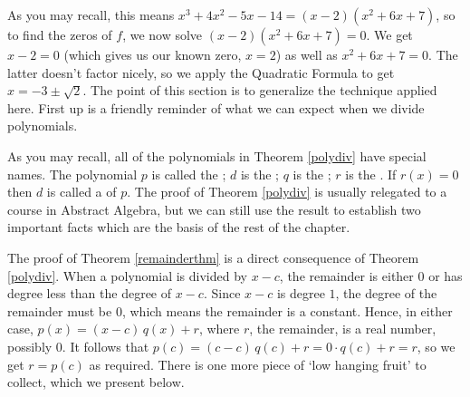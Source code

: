 \setlength\arraycolsep{5pt}
\setlength\extrarowheight{0pt}

As you may recall, this means $x^3 + 4x^2-5x-14=(x-2)\left(x^2+6x+7\right)$, so to find the zeros of $f$, we now solve $(x-2)\left(x^2+6x+7\right)=0$.   We get $x-2=0$ (which gives us our known zero, $x=2$) as well as $x^2+6x+7=0$.   The latter doesn't factor nicely, so we apply the Quadratic Formula to get $x = -3 \pm \sqrt{2}$.  The point of this section is to generalize the technique applied here.  First up is a friendly reminder of what we can expect when we divide polynomials.

\smallskip


\smallskip

As you may recall, all of the polynomials in Theorem \ref{polydiv} have special names.  The polynomial $p$ is called the  ; $d$ is the  ; $q$ is the  ; $r$ is the  .  If $r(x)=0$ then $d$ is called a   of $p$.  The proof of Theorem \ref{polydiv} is usually relegated to a course in Abstract Algebra, but we can still use the result to establish two important facts which are the basis of the rest of the chapter.

\smallskip


\smallskip


The proof of Theorem \ref{remainderthm} is a direct consequence of Theorem \ref{polydiv}.  When a polynomial is divided by $x-c$, the remainder is either $0$ or has degree less than the degree of $x-c$.  Since $x-c$ is degree $1$, the degree of the remainder must be $0$, which means the remainder is a constant.  Hence, in either case, $p(x) = (x-c) \, q(x) + r$, where $r$, the remainder, is a real number, possibly $0$.  It follows that $p(c) = (c-c) \, q(c) + r = 0 \cdot q(c) + r = r$, so we get $r = p(c)$ as required.  There is one more piece of `low hanging fruit' to collect, which we present below.

